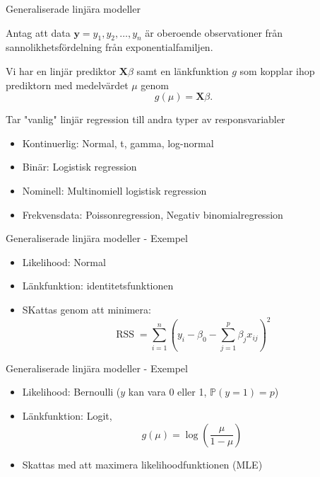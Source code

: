 \documentclass[10pt,english]{beamer}
\begin{document}
\begin{frame}{Generaliserade linjära modeller}

    Antag att data $\mathbf{y} = y_1, y_2, \ldots, y_n$ är oberoende observationer från sannolikhetsfördelning från exponentialfamiljen.

    Vi har en linjär prediktor $\mathbf{X} \beta$ samt en länkfunktion $g$ som kopplar ihop prediktorn med medelvärdet $\mu$ genom
    \begin{equation*}
        g(\mu) = \mathbf{X} \beta.
    \end{equation*}
    
    Tar "vanlig" linjär regression till andra typer av responsvariabler
    \begin{itemize}
        \item Kontinuerlig: Normal, t, gamma, log-normal
        \item Binär: Logistisk regression
        \item Nominell: Multinomiell logistisk regression
        \item Frekvensdata: Poissonregression, Negativ binomialregression
    \end{itemize}
\end{frame}

\begin{frame}{Generaliserade linjära modeller - Exempel}

    \begin{itemize}
        \item Likelihood: Normal
        \item L\"ankfunktion: identitetsfunktionen
        \item SKattas genom att minimera:
        \begin{equation*}
            \operatorname{RSS} = \sum_{i=1}^{n} \left( y_i - \beta_0 - \sum_{j=1}^{p} \beta_j x_{ij} \right)^2
        \end{equation*}
    \end{itemize}

\end{frame}

\begin{frame}{Generaliserade linjära modeller - Exempel}
    \begin{itemize}
        \item Likelihood: Bernoulli ($y$ kan vara 0 eller 1, $\mathbb{P}(y = 1) = p$)
        \item L\"ankfunktion: Logit,
        \begin{equation*}
            g(\mu) = \log\left( \frac{\mu}{1-\mu} \right)
        \end{equation*}
        \item Skattas med att maximera likelihoodfunktionen (MLE)
    \end{itemize}
\end{frame}
\end{document}
